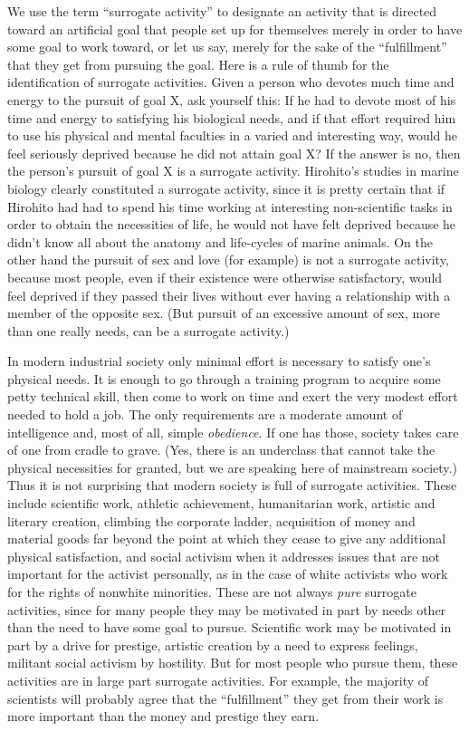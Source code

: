  We use the term “surrogate activity” to designate an activity that is directed toward an artificial goal that people set up for themselves merely in order to have some goal to work toward, or let us say, merely for the sake of the “fulfillment” that they get from pursuing the goal. Here is a rule of thumb for the identification of surrogate activities. Given a person who devotes much time and energy to the pursuit of goal X, ask yourself this: If he had to devote most of his time and energy to satisfying his biological needs, and if that effort required him to use his physical and mental faculties in a varied and interesting way, would he feel seriously deprived because he did not attain goal X? If the answer is no, then the person’s pursuit of goal X is a surrogate activity. Hirohito’s studies in marine biology clearly constituted a surrogate activity, since it is pretty certain that if Hirohito had had to spend his time working at interesting non-scientific tasks in order to obtain the necessities of life, he would not have felt deprived because he didn’t know all about the anatomy and life-cycles of marine animals. On the other hand the pursuit of sex and love (for example) is not a surrogate activity, because most people, even if their existence were otherwise satisfactory, would feel deprived if they passed their lives without ever having a relationship with a member of the opposite sex. (But pursuit of an excessive amount of sex, more than one really needs, can be a surrogate activity.)

 In modern industrial society only minimal effort is necessary to satisfy one’s physical needs. It is enough to go through a training program to acquire some petty technical skill, then come to work on time and exert the very modest effort needed to hold a job. The only requirements are a moderate amount of intelligence and, most of all, simple {\em obedience}. If one has those, society takes care of one from cradle to grave. (Yes, there is an underclass that cannot take the physical necessities for granted, but we are speaking here of mainstream society.) Thus it is not surprising that modern society is full of surrogate activities. These include scientific work, athletic achievement, humanitarian work, artistic and literary creation, climbing the corporate ladder, acquisition of money and material goods far beyond the point at which they cease to give any additional physical satisfaction, and social activism when it addresses issues that are not important for the activist personally, as in the case of white activists who work for the rights of nonwhite minorities. These are not always {\em pure} surrogate activities, since for many people they may be motivated in part by needs other than the need to have some goal to pursue. Scientific work may be motivated in part by a drive for prestige, artistic creation by a need to express feelings, militant social activism by hostility. But for most people who pursue them, these activities are in large part surrogate activities. For example, the majority of scientists will probably agree that the “fulfillment” they get from their work is more important than the money and prestige they earn.

